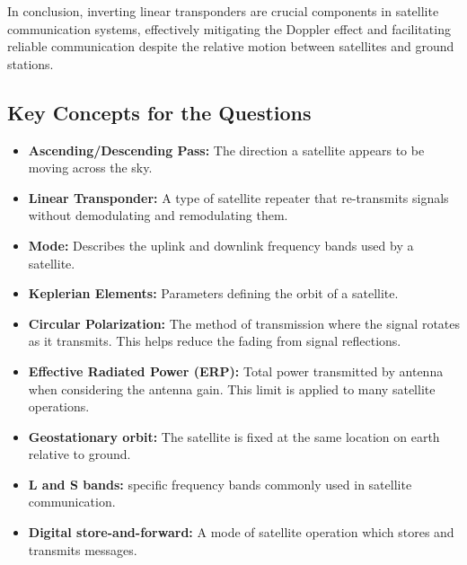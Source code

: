 In conclusion, inverting linear transponders are crucial components in satellite communication systems, effectively mitigating the Doppler effect and facilitating reliable communication despite the relative motion between satellites and ground stations.


  
\subsection*{Key Concepts for the Questions}
\begin{itemize}
    \item \textbf{Ascending/Descending Pass:} The direction a satellite appears to be moving across the sky.
    \item \textbf{Linear Transponder:} A type of satellite repeater that re-transmits signals without demodulating and remodulating them.
    \item \textbf{Mode:} Describes the uplink and downlink frequency bands used by a satellite.
    \item \textbf{Keplerian Elements:}  Parameters defining the orbit of a satellite.
    \item \textbf{Circular Polarization:}  The method of transmission where the signal rotates as it transmits. This helps reduce the fading from signal reflections.
    \item \textbf{Effective Radiated Power (ERP):} Total power transmitted by antenna when considering the antenna gain. This limit is applied to many satellite operations.
     \item \textbf{Geostationary orbit:} The satellite is fixed at the same location on earth relative to ground.
    \item \textbf{L and S bands:} specific frequency bands commonly used in satellite communication.
    \item \textbf{Digital store-and-forward:} A mode of satellite operation which stores and transmits messages.

\end{itemize}

